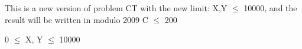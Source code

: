 This is a new version of problem CT with the new limit: X,Y $\le$ 10000, and the result will be written in modulo 2009
C  $\le$  200   


   0  $\le$  X, Y  $\le$  10000
